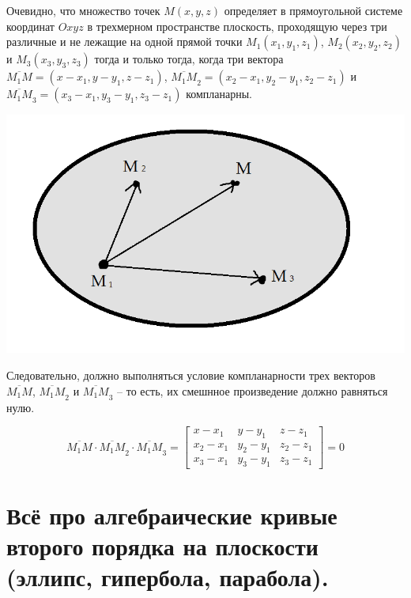 \documentclass{article}
\begin{document}
Очевидно, что множество точек $M(x,y,z)$ определяет в прямоугольной системе координат $Oxyz$ в трехмерном пространстве плоскость, проходящую через три различные и не лежащие на одной прямой точки $M_1(x_1,y_1,z_1)$, $M_2(x_2,y_2,z_2)$ и $M_3(x_3,y_3,z_3)$ тогда и только тогда, когда три вектора $\overline{M_1M}=(x-x_1,y-y_1,z-z_1)$, $\overline{M_1M}_2=(x_2-x_1,y_2-y_1,z_2-z_1)$ и $\overline{M_1M}_3=(x_3-x_1,y_3-y_1,z_3-z_1)$ компланарны.
\begin{center}
    \includegraphics[scale=0.4]{pic13.png}
\end{center}
Следовательно, должно выполняться условие компланарности трех векторов $\overline{M_1M}$, $\overline{M_1M}_2$ и $\overline{M_1M}_3$ -- то есть, их смешнное произведение должно равняться нулю.

\[
    \overline{M_1M}\cdot\overline{M_1M}_2\cdot\overline{M_1M}_3
    =
    \begin{bmatrix}
    x-x_1 & y-y_1 & z-z_1 \\
    x_2-x_1 & y_2-y_1 & z_2-z_1 \\
    x_3-x_1 & y_3-y_1 & z_3-z_1
    \end{bmatrix}
    = 0
    \]
\newpage
\section{Всё про алгебраические кривые второго порядка на плоскости (эллипс, гипербола, парабола).}
\end{document}

